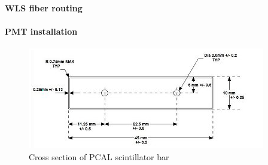 \paragraph{WLS fiber routing}
\paragraph{PMT installation}

\begin{figure}
\centering
\includegraphics[scale=1.0]{pcal_bar_cross_section.png}
\caption{Cross section of PCAL scintillator bar}
\label{pcal-bar-xsec}
\end{figure}







